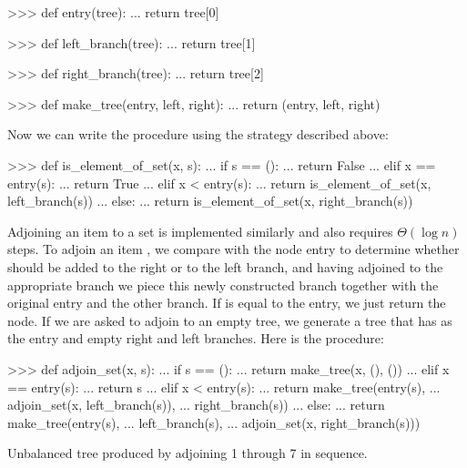 \begin{codeBlock}
>>> def entry(tree):
...     return tree[0]

>>> def left_branch(tree):
...     return tree[1]

>>> def right_branch(tree):
...     return tree[2]

>>> def make_tree(entry, left, right):
...     return (entry, left, right)
\end{codeBlock}

\noindent
Now we can write the  procedure using the strategy
described above:

\begin{codeBlock}
>>> def is_element_of_set(x, s):
...     if s == ():
...         return False
...     elif x == entry(s):
...         return True
...     elif x < entry(s):
...         return is_element_of_set(x, left_branch(s))
...     else:
...         return is_element_of_set(x, right_branch(s))
\end{codeBlock}

\noindent
Adjoining an item to a set is implemented similarly and also requires
\( \Theta(\log n) \) steps.  To adjoin an item , we compare
 with the node entry to determine whether  should be added to
the right or to the left branch, and having adjoined  to the
appropriate branch we piece this newly constructed branch together with the
original entry and the other branch.  If  is equal to the entry, we
just return the node.  If we are asked to adjoin  to an empty tree, we
generate a tree that has  as the entry and empty right and left
branches.  Here is the procedure:

\begin{codeBlock}
>>> def adjoin_set(x, s):
...     if s == ():
...         return make_tree(x, (), ())
...     elif x == entry(s):
...         return s
...     elif x < entry(s):
...         return make_tree(entry(s),
...                          adjoin_set(x, left_branch(s)),
...                          right_branch(s))
...     else:
...         return make_tree(entry(s),
...                          left_branch(s),
...                          adjoin_set(x, right_branch(s)))
\end{codeBlock}

\begin{imageFigure}{Unbalanced tree produced by adjoining 1 through 7 in
  sequence.}
  
\end{imageFigure}

